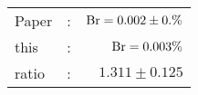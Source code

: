       \begin{tabular}{lcr}
          Paper &:& $\mathrm{Br}  = 0.002\pm 0.\%$ \\
          this      &:& $\mathrm{Br}  = 0.003\%$ \\
		  ratio   &:& $1.311\pm 0.125$ \\
      \end{tabular}
